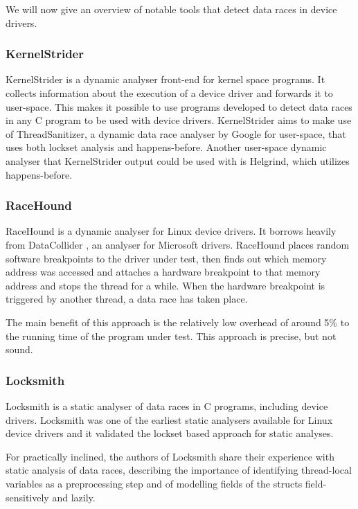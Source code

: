 \documentclass[..thesis.tex]{subfiles}
\begin{document}
We will now give an overview of notable tools that detect data races in device drivers.

\subsubsection{KernelStrider}

KernelStrider\cite{shatokhin_kernel_????} is a dynamic analyser front-end for kernel space programs.
It collects information about the execution of a device driver and forwards it to user-space.
This makes it possible to use programs developed to detect data races in any C program to be used with device drivers.
KernelStrider aims to make use of ThreadSanitizer\cite{serebryany_threadsanitizer:_2009}, a dynamic data race analyser by Google for user-space,
that uses both lockset analysis and happens-before. Another user-space dynamic analyser that KernelStrider output could be used with is Helgrind,
\cite{_helgrind_????,nethercote_valgrind:_2007} which utilizes happens-before.

\subsubsection{RaceHound}

RaceHound\cite{komarov_implementation_2013} is a dynamic analyser for Linux device drivers.
It borrows heavily from DataCollider \cite{erickson_effective_2010}, an analyser for Microsoft drivers.
RaceHound places random software breakpoints to the driver under test,
then finds out which memory address was accessed and attaches a hardware breakpoint to that memory address and stops the thread for a while.
When the hardware breakpoint is triggered by another thread, a data race has taken place.

The main benefit of this approach is the relatively low overhead of around 5\% to the running time of the program under test.
This approach is precise, but not sound.

\subsubsection{Locksmith}
Locksmith\cite{pratikakis_locksmith:_2006} is a static analyser of data races in C programs, including device drivers.
Locksmith was one of the earliest static analysers available for Linux device drivers and it validated the lockset based approach for static analyses. 

For practically inclined, the authors of Locksmith share their experience with static analysis of data races,
describing the importance of identifying thread-local variables as a preprocessing step and of modelling fields of the structs field-sensitively and lazily\cite{pratikakis_locksmith:_2011}.
\end{document}
